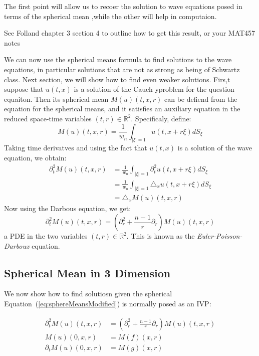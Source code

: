 \documentclass{book}
\newenvironment{Proof}[1][]
  {\begin{ProofTcb}[#1]}
  {\end{ProofTcb}}
\newcommand{\R}{{\mathbb{R}}}
\begin{document}
The first point will allow us to recoer the solution to wave equations posed in terms of the spherical mean ,while the
other will help in computaion.

\begin{Proof}
	See Folland chapter 3 section 4 to outline how to get this result, or your MAT457 notes
\end{Proof}

We can now use the spherical means formula to find solutions to the wave equations, in particular solutions that are not
as strong as being of Schwartz class. Next section, we will show how to find even weaker solutions.  Firs,t suppose that
$u(t,x)$ is a solution of the Cauch yproblem for the question equaiton. Then its spherical mean $M(u)(t,x,r)$ can be
defiend from the equation for the spherical means, and it satisfies an auxiliary equation in the reduced space-time
variables $(t,r) \in \R^2$. Specificaly, define:
\[
	M(u)(t,x,r) = \frac{1}{w_n} \int_{|\xi| =1} u(t, x + r\xi) dS_\xi
\]
Taking time derivatves and using the fact that $u(t,x)$ is a solution of the wave equation, we obtain:
\begin{align*}
	\partial_t^2 M(u)(t,x,r) &= \frac{1}{w_n} \int_{|\xi| =1}  \partial_t^2 u(t,x + r\xi) dS_\xi\\
							 &= \frac{1}{w_n} \int_{|\xi| = 1} \triangle_x u(t, x + r\xi) dS_\xi\\
							 &= \triangle_x M(u)(t,x,r)
\end{align*}
Now using the Darbous equation, we get:
\begin{equation}\label{eq:sphereMeansModified}
  \partial_t^2 M(u)(t,x,r) = \left(  \partial_r^2 + \frac{n-1}{r}  \partial_r\right) M(u)(t,x,r)
\end{equation}
a PDE in the two variables $(t,r) \in \R^2$. This is known as the \emph{Euler-Poisson-Darboux} equation.

\subsection{Spherical Mean in 3 Dimension}

We now show how to find solutiosn given the spherical Equation~(\ref{eq:sphereMeansModified}) is normally posed as an
IVP:

\begin{align*}
	 \partial_t^2 M(u)(t,x,r) &= \left(  \partial_r^2 + \frac{n-1}{r}  \partial_r \right) M(u)(t,x,r)\\
	 M(u)(0,x,r) &= M(f)(x,r)\\
	  \partial_t M(u)(0,x,r) &= M(g)(x,r)
\end{align*}
\end{document}

